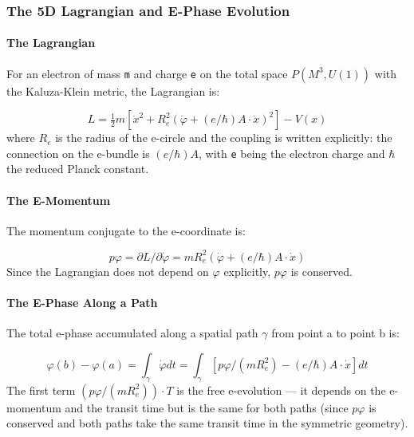 \documentclass[aps,prd,preprint,superscriptaddress,longbibliography,floatfix]{revtex4-2}
\theoremstyle{remark}
\begin{document}
\subsubsection{The 5D Lagrangian and E-Phase Evolution}


\paragraph{The Lagrangian}

For an electron of mass \texttt{m} and charge \texttt{e} on the total space $P(M^{3}, U(1))$ with the Kaluza-Klein metric, the Lagrangian is:


\begin{equation}
    L = \tfrac{1}{2}m[\dot{x}^{2} + R_e^{2}(\dot{\varphi} + (e/\hbar)A \cdot \dot{x})^{2}] - V(x)
\end{equation}
where $R_e$ is the radius of the e-circle and the coupling is written explicitly: the connection on the e-bundle is $(e/\hbar)A$, with \texttt{e} being the electron charge and $\hbar$ the reduced Planck constant.


\paragraph{The E-Momentum}

The momentum conjugate to the e-coordinate is:


\begin{equation}
    p\varphi = \partial L/\partial\dot{\varphi} = mR_e^{2}(\dot{\varphi} + (e/\hbar)A \cdot \dot{x})
\end{equation}
Since the Lagrangian does not depend on $\varphi$ explicitly, $p\varphi$ is conserved.


\paragraph{The E-Phase Along a Path}

The total e-phase accumulated along a spatial path $\gamma$ from point a to point b is:


\begin{equation}
    \varphi(b) - \varphi(a) = \int_\gamma \dot{\varphi} dt = \int_\gamma [p\varphi/(mR_e^{2}) - (e/\hbar)A \cdot \dot{x}] dt
\end{equation}
The first term $(p\varphi/(mR_e^{2}))\cdot T$ is the free e-evolution --- it depends on the e-momentum and the transit time but is the same for both paths (since $p\varphi$ is conserved and both paths take the same transit time in the symmetric geometry).
\end{document}
